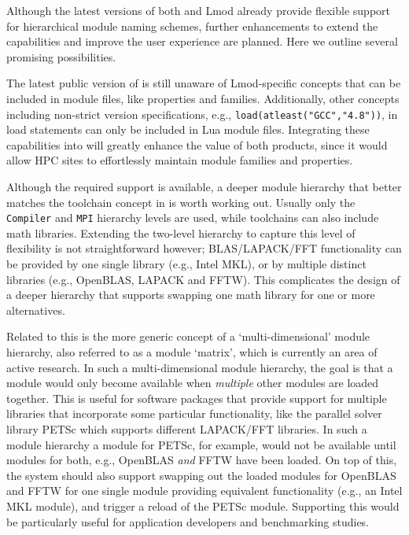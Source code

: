 Although the latest versions of both \easybuild{} and Lmod already provide
flexible support for hierarchical module naming schemes, further enhancements
to extend the capabilities and improve the user experience are planned.
Here we outline several promising possibilities.

The latest public version of \easybuild{} is still unaware of Lmod-specific
concepts that can be included in module files, like properties and families.
Additionally, other concepts including non-strict version specifications, e.g.,
\texttt{\small load(atleast("GCC","4.8"))}, in 
load statements can only be included in Lua module files.
Integrating these capabilities into \easybuild{} will
greatly enhance the value of both products, since it would allow HPC sites to
effortlessly maintain module families and properties.

Although the required support is available, a deeper module hierarchy that
better matches the toolchain concept in \easybuild{} is worth working out.
Usually only the \texttt{Compiler} and \texttt{MPI} hierarchy levels are used,
while \easybuild{} toolchains can also include math libraries. Extending
the two-level hierarchy to capture this level of flexibility is not straightforward
however; BLAS/LAPACK/FFT functionality can be provided by one single library (e.g.,
Intel MKL), or by multiple distinct libraries (e.g., OpenBLAS, LAPACK and FFTW).
This complicates the design of a deeper hierarchy that supports swapping one
math library for one or more alternatives.

Related to this is the more generic concept of a `multi-dimensional' module hierarchy,
also referred to as a module `matrix', which is currently an area of active research.
In such a multi-dimensional module hierarchy, the goal is that a module would
only become available when \emph{multiple} other modules are loaded together. This is
useful for software packages that provide support for multiple libraries that
incorporate some particular functionality, like the parallel
solver library PETSc which supports different LAPACK/FFT libraries. In such a module
hierarchy a module for PETSc, for example, would not be available until modules
for both, e.g., OpenBLAS \emph{and} FFTW have been loaded. On top of this, the system
should also support swapping out the loaded modules for OpenBLAS and FFTW for one
single module providing equivalent functionality (e.g., an Intel MKL module), and
trigger a reload of the PETSc module. Supporting this would be particularly useful for
application developers and benchmarking studies.

